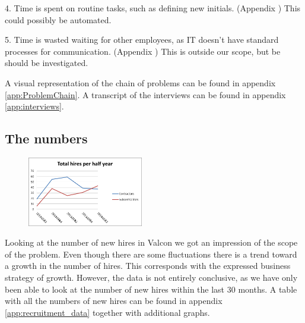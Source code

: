 4. Time is spent on routine tasks, such as defining new initials.
(Appendix )
This could possibly be automated.

5. Time is wasted waiting for other employees, as IT doesn't have standard processes for communication.
(Appendix )
This is outside our scope, but be should be investigated.

A visual representation of the chain of problems can be found in appendix \ref{app:ProblemChain}.
A transcript of the interviews can be found in appendix \ref{app:interviews}.

\subsection{The numbers}
\begin{figure}
\vspace{-20pt}
\centering
\includegraphics[width=0.45\textwidth]{appendix/total_hires_per_half_year.png}
\label{fig:total_hires_per_half_year}
\end{figure}
Looking at the number of new hires in Valcon we got an impression of the scope of the problem.
Even though there are some fluctuations there is a trend toward a growth in the number of hires.
This corresponds with the expressed business strategy of growth.
However, the data is not entirely conclusive, as we have only been able to look at the number of new hires within the last 30 months.
A table with all the numbers of new hires can be found in appendix \ref{app:recruitment_data} together with additional graphs.
